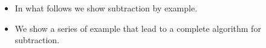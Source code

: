 \begin{frame}
\begin{itemize}
\item In what follows we show subtraction by example.
\item<2-> We show a series of example that lead to a complete algorithm for subtraction.
\end{itemize}
\end{frame}
